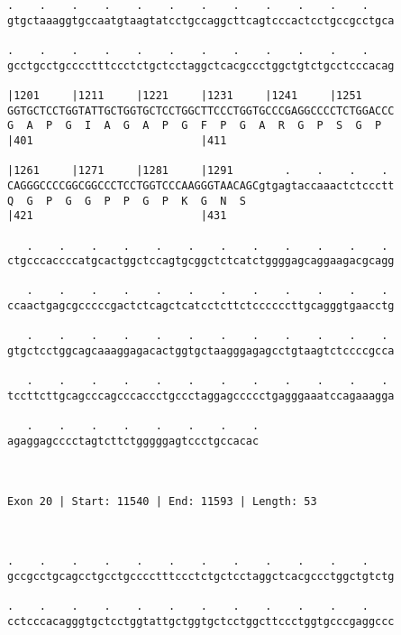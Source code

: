 \documentclass{article}
\begin{document}
\begin{Verbatim}
.    .    .    .    .    .    .    .    .    .    .    .    
gtgctaaaggtgccaatgtaagtatcctgccaggcttcagtcccactcctgccgcctgca
                                                            
.    .    .    .    .    .    .    .    .    .    .    .    
gcctgcctgcccctttccctctgctcctaggctcacgccctggctgtctgcctcccacag
                                                            
|1201     |1211     |1221     |1231     |1241     |1251     
GGTGCTCCTGGTATTGCTGGTGCTCCTGGCTTCCCTGGTGCCCGAGGCCCCTCTGGACCC
G  A  P  G  I  A  G  A  P  G  F  P  G  A  R  G  P  S  G  P  
|401                          |411                          
  
|1261     |1271     |1281     |1291        .    .    .    . 
CAGGGCCCCGGCGGCCCTCCTGGTCCCAAGGGTAACAGCgtgagtaccaaactctccctt
Q  G  P  G  G  P  P  G  P  K  G  N  S                       
|421                          |431                          
  
   .    .    .    .    .    .    .    .    .    .    .    . 
ctgcccaccccatgcactggctccagtgcggctctcatctggggagcaggaagacgcagg
                                                            
   .    .    .    .    .    .    .    .    .    .    .    . 
ccaactgagcgcccccgactctcagctcatcctcttctccccccttgcagggtgaacctg
                                                            
   .    .    .    .    .    .    .    .    .    .    .    . 
gtgctcctggcagcaaaggagacactggtgctaagggagagcctgtaagtctccccgcca
                                                            
   .    .    .    .    .    .    .    .    .    .    .    . 
tccttcttgcagcccagcccaccctgccctaggagccccctgagggaaatccagaaagga
                                                            
   .    .    .    .    .    .    .    .
agaggagcccctagtcttctgggggagtccctgccacac
                                       
                                       
 
Exon 20 | Start: 11540 | End: 11593 | Length: 53



.    .    .    .    .    .    .    .    .    .    .    .    
gccgcctgcagcctgcctgcccctttccctctgctcctaggctcacgccctggctgtctg
                                                            
.    .    .    .    .    .    .    .    .    .    .    .    
cctcccacagggtgctcctggtattgctggtgctcctggcttccctggtgcccgaggccc
                                                            

\end{Verbatim}
\end{document}
